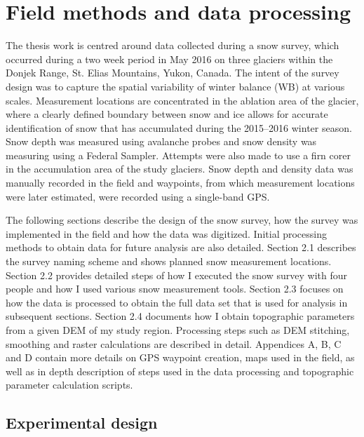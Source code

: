 \documentclass{sfuthesis}
\begin{document}

\chapter{Field methods and data processing}

The thesis work is centred around data collected during a snow survey, which occurred during a two week period in May 2016 on three glaciers within the Donjek Range, St. Elias Mountains, Yukon, Canada. The intent of the survey design was to capture the spatial variability of winter balance (WB) at various scales. Measurement locations are concentrated in the ablation area of the glacier, where a clearly defined boundary between snow and ice allows for accurate identification of snow that has accumulated during the 2015--2016 winter season. Snow depth was measured using avalanche probes and snow density was measuring using a Federal Sampler. Attempts were also made to use a firn corer in the accumulation area of the study glaciers. Snow depth and density data was manually recorded in the field and waypoints, from which measurement locations were later estimated, were recorded using a single-band GPS. 

The following sections describe the design of the snow survey, how the survey was implemented in the field and how the data was digitized. Initial processing methods to obtain data for future analysis are also detailed. Section 2.1 describes the survey naming scheme and shows planned snow measurement locations. Section 2.2 provides detailed steps of how I executed the snow survey with four people and how I used various snow measurement tools. Section 2.3 focuses on how the data is processed to obtain the full data set that is used for analysis in subsequent sections. Section 2.4 documents how I obtain topographic parameters from a given DEM of my study region. Processing steps such as DEM stitching, smoothing and raster calculations are described in detail. Appendices A, B, C and D contain more details on GPS waypoint creation, maps used in the field, as well as in depth description of steps used in the data processing and topographic parameter calculation scripts. 

\section{Experimental design}
\label{sec:FieldDesign}
\end{document}
